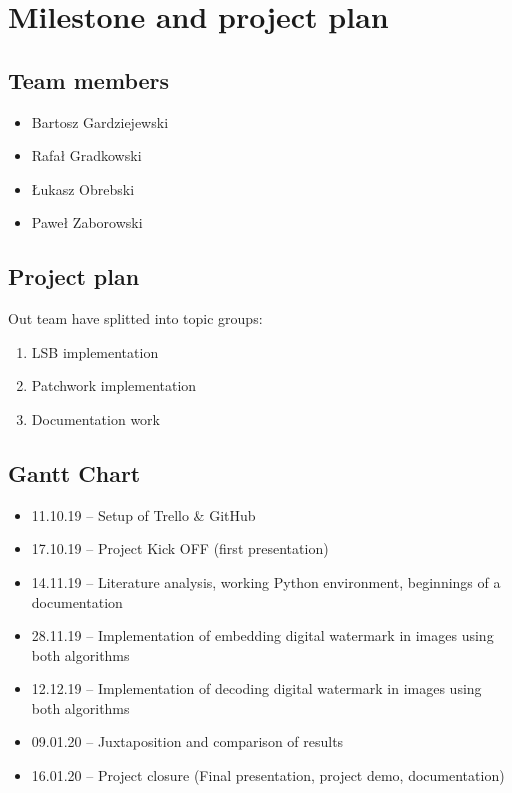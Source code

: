 \documentclass{article}
\begin{document}
\section{Milestone and project plan}

	\subsection{Team members}
	
	\begin{itemize}
		\item Bartosz Gardziejewski
		\item Rafał Gradkowski
		\item Łukasz Obrebski
		\item Paweł Zaborowski
	\end{itemize}

	\subsection{Project plan}
	
	Out team have splitted into topic groups:
	
	\begin{enumerate}
		\item LSB implementation
		\item Patchwork implementation
		\item Documentation work
	\end{enumerate}
	

	\subsection{Gantt Chart}
	
	\begin{itemize}
	

	\item 11.10.19 – Setup of Trello \& GitHub
	\item 17.10.19 – Project Kick OFF (first presentation)
	\item 14.11.19 – Literature analysis, working Python environment, beginnings of a documentation
	\item 28.11.19 – Implementation of embedding digital watermark in images using both algorithms
	\item 12.12.19 – Implementation of decoding digital watermark in images using both algorithms
	\item 09.01.20 – Juxtaposition and comparison of results
	\item 16.01.20 – Project closure (Final presentation, project demo, documentation)
	\end{itemize}
	
\end{document}
